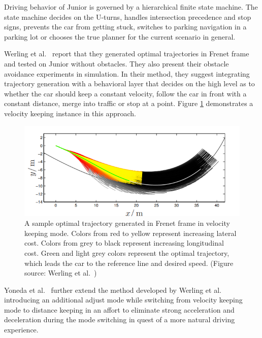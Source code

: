 Driving behavior of Junior is governed by a hierarchical finite state machine.
The state machine decides on the U-turns, handles intersection precedence and
stop signs, prevents the car from getting stuck, switches to parking navigation
in a parking lot or chooses the true planner for the current scenario in
general.

Werling et al.\ \cite{Werling2010OptimalTG} report that they generated optimal
trajectories in Frenet frame and tested on Junior without obstacles. They
also present their obstacle avoidance experiments in simulation. In their
method, they suggest integrating trajectory generation with a behavioral layer
that decides on the high level as to whether the car should keep a constant
velocity, follow the car in front with a constant distance, merge into
traffic or stop at a point. Figure \ref{figure:frenet-velocity-keeping}
demonstrates a velocity keeping instance in this approach.

\begin{figure}[h]
  \centering
  \includegraphics[width=.8\textwidth]{figures/frenet-velocity-keeping.png}
  \caption[A sample optimal trajectory generated in Frenet frame]{A sample
    optimal trajectory generated in Frenet frame in velocity keeping mode.
    Colors from red to yellow represent increasing lateral cost. Colors from
    grey to black represent increasing longitudinal cost. Green and light grey
    colors represent the optimal trajectory, which leads the car to the
    reference line and desired speed. (Figure source: Werling et al.\
    \cite{Werling2010OptimalTG})}
  \label{figure:frenet-velocity-keeping}
\end{figure}

Yoneda et al.\ \cite{Yoneda2018TrajectoryOA} further extend the method developed
by Werling et al.\ \cite{Werling2010OptimalTG} introducing an additional adjust
mode while switching from velocity keeping mode to distance keeping in an
affort to eliminate strong acceleration and deceleration during the mode
switching in quest of a more natural driving experience.


